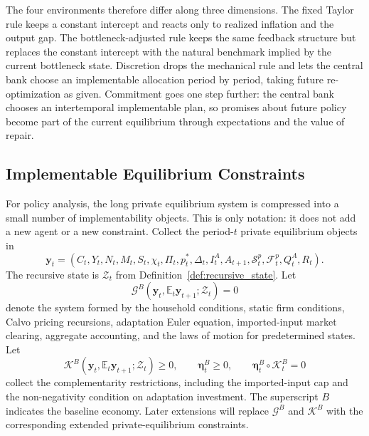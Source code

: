 ﻿\documentclass[12pt]{article}
\theoremstyle{remark}
\newcommand{\E}{\mathbb E}
\begin{document}
The four environments therefore differ along three dimensions. The fixed Taylor rule keeps a
constant intercept and reacts only to realized inflation and the output gap. The
bottleneck-adjusted rule keeps the same feedback structure but replaces the constant intercept with
the natural benchmark implied by the current bottleneck state. Discretion drops the mechanical rule
and lets the central bank choose an implementable allocation period by period, taking future
re-optimization as given. Commitment goes one step further: the central bank chooses an
intertemporal implementable plan, so promises about future policy become part of the current
equilibrium through expectations and the value of repair.

\subsection{Implementable Equilibrium Constraints}

For policy analysis, the long private equilibrium system is compressed into a small number of
implementability objects. This is only notation: it does not add a new agent or a new constraint.
Collect the period-$t$ private equilibrium objects in
\begin{equation}
    \mathbf y_t
    =
    (C_t,Y_t,N_t,M_t,S_t,\chi_t,\Pi_t,p_t^*,\Delta_t,I_t^A,A_{t+1},
    \mathcal S_t^p,\mathcal F_t^p,Q_t^A,R_t).
    \label{eq:policy_choice_vector}
\end{equation}
The recursive state is $\mathcal Z_t$ from Definition~\ref{def:recursive_state}. Let
\begin{equation}
    \mathcal G^B
    \left(
        \mathbf y_t,
        \E_t\mathbf y_{t+1};
        \mathcal Z_t
    \right)
    =
    0
    \label{eq:baseline_implementability}
\end{equation}
denote the system formed by the household conditions, static firm conditions, Calvo pricing
recursions, adaptation Euler equation, imported-input market clearing, aggregate accounting, and
the laws of motion for predetermined states. Let
\begin{equation}
    \mathcal K^B
    \left(
        \mathbf y_t,
        \E_t\mathbf y_{t+1};
        \mathcal Z_t
    \right)
    \ge 0,
    \qquad
    \boldsymbol\eta_t^B\ge 0,
    \qquad
    \boldsymbol\eta_t^B\circ \mathcal K^B_t=0
    \label{eq:baseline_complementarity_set}
\end{equation}
collect the complementarity restrictions, including the imported-input cap and the non-negativity
condition on adaptation investment. The superscript $B$ indicates the baseline economy. Later
extensions will replace $\mathcal G^B$ and $\mathcal K^B$ with the corresponding extended
private-equilibrium constraints.
\end{document}
